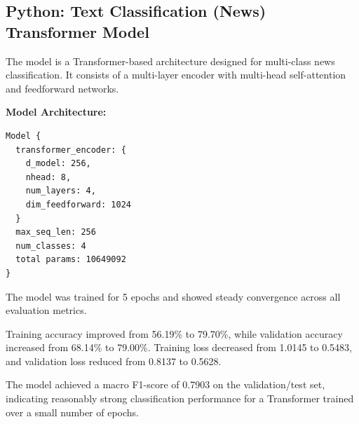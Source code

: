 \documentclass[10pt,a4paper,twocolumn]{article}
\begin{document}
\subsection{Python: Text Classification (News) Transformer Model}

The model is a Transformer-based architecture designed for multi-class news classification. It consists of a multi-layer encoder with multi-head self-attention and feedforward networks.

\textbf{Model Architecture:}

\begin{verbatim}
Model {
  transformer_encoder: {
    d_model: 256,
    nhead: 8,
    num_layers: 4,
    dim_feedforward: 1024
  }
  max_seq_len: 256
  num_classes: 4
  total params: 10649092
}
\end{verbatim}

The model was trained for 5 epochs and showed steady convergence across all evaluation metrics.

Training accuracy improved from 56.19\% to 79.70\%, while validation accuracy increased from 68.14\% to 79.00\%. 
Training loss decreased from 1.0145 to 0.5483, and validation loss reduced from 0.8137 to 0.5628.

The model achieved a macro F1-score of 0.7903 on the validation/test set, indicating reasonably strong classification performance for a Transformer trained over a small number of epochs.
\end{document}
